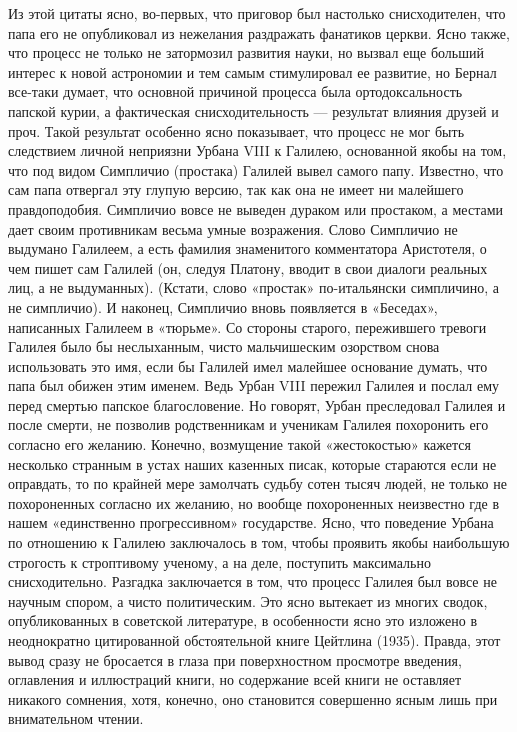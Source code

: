 Из   этой  цитаты   ясно,  во-первых,   что  приговор   был  настолько
снисходителен,  что папа  его не  опубликовал из  нежелания раздражать
фанатиков  церкви. Ясно  также, что  процесс не  только не  затормозил
развития науки, но вызвал еще больший интерес к новой астрономии и тем
самым  стимулировал  ее  развитие,  но  Бернал  все-таки  думает,  что
основной  причиной процесса  была  ортодоксальность  папской курии,  а
фактическая  снисходительность ---  результат влияния  друзей и  проч.
Такой  результат особенно  ясно показывает,  что процесс  не мог  быть
следствием личной неприязни Урбана VIII к Галилею, основанной якобы на
том, что  под видом  Симпличио (простака)  Галилей вывел  самого папу.
Известно,  что  сам папа  отвергал  эту  глупую  версию, так  как  она
не  имеет  ни  малейшего  правдоподобия. Симпличио  вовсе  не  выведен
дураком или простаком,  а местами дает своим  противникам весьма умные
возражения.  Слово  Симпличио не  выдумано  Галилеем,  а есть  фамилия
знаменитого  комментатора Аристотеля,  о  чем пишет  сам Галилей  (он,
следуя Платону, вводит в свои  диалоги реальных лиц, а не выдуманных).
(Кстати, слово «простак» по-итальянски  симпличино, а не симпличио). И
наконец, Симпличио вновь появляется в «Беседах», написанных Галилеем в
«тюрьме».  Со стороны  старого,  пережившего тревоги  Галилея было  бы
неслыханным, чисто мальчишеским озорством  снова использовать это имя,
если бы  Галилей имел малейшее  основание думать, что папа  был обижен
этим  именем. Ведь  Урбан  VIII  пережил Галилея  и  послал ему  перед
смертью папское благословение. Но говорят, Урбан преследовал Галилея и
после смерти, не позволив  родственникам и ученикам Галилея похоронить
его  согласно его  желанию.  Конечно,  возмущение такой  «жестокостью»
кажется  несколько  странным в  устах  наших  казенных писак,  которые
стараются если не оправдать, то по крайней мере замолчать судьбу сотен
тысяч  людей,  не  только  не похороненных  согласно  их  желанию,  но
вообще похороненных неизвестно где в нашем «единственно прогрессивном»
государстве.  Ясно,  что  поведение  Урбана  по  отношению  к  Галилею
заключалось  в  том,  чтобы  проявить  якобы  наибольшую  строгость  к
строптивому ученому, а на  деле, поступить максимально снисходительно.
Разгадка заключается в  том, что процесс Галилея был  вовсе не научным
спором,  а чисто  политическим. Это  ясно вытекает  из многих  сводок,
опубликованных в советской литературе, в особенности ясно это изложено
в  неоднократно  цитированной  обстоятельной  книге  Цейтлина  (1935).
Правда,  этот  вывод сразу  не  бросается  в глаза  при  поверхностном
просмотре введения, оглавления и иллюстраций книги, но содержание всей
книги не  оставляет никакого  сомнения, хотя, конечно,  оно становится
совершенно ясным лишь при внимательном чтении.

